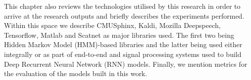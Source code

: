 This chapter also reviews the technologies utilised by this research in order to arrive at the research outputs and briefly describes the experiments performed.  Within this space we describe CMUSphinx, Kaldi, Mozilla Deepspeech, Tensorflow, Matlab and Scatnet as major libraries used.   The first two being Hidden Markov Model (HMM)-based libraries and the latter being used either integrally or as part of end-to-end  and signal processing systems used to build Deep Recurrent Neural Network (RNN) models. Finally, we mention metrics for the evaluation of the models built in this work.
